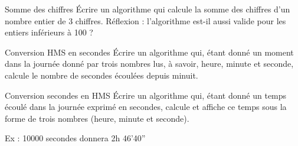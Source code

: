 \begin{Exercice}{Somme des chiffres}
	Écrire un algorithme qui calcule la somme des chiffres
	d'un nombre entier de 3 chiffres.
	Réflexion : l’algorithme est-il aussi valide pour les entiers inférieurs
	à 100 ?
\end{Exercice}

\begin{Exercice}{Conversion HMS en secondes}
	Écrire un algorithme qui, étant donné un moment dans la journée donné
	par trois nombres lus, à savoir, heure, minute et seconde, calcule le
	nombre de secondes écoulées depuis minuit.
\end{Exercice}

\begin{Exercice}{Conversion secondes en HMS}
	Écrire un algorithme qui, étant donné un temps écoulé dans la journée
	exprimé en secondes, calcule et affiche ce temps sous la forme de trois
	nombres (heure, minute et seconde).

	Ex : 10000 secondes donnera 2h 46'40''
\end{Exercice}

